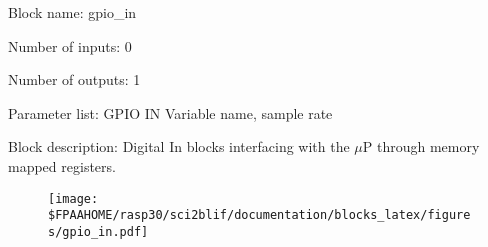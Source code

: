 \pagebreak

Block name: gpio\_in

Number of inputs: 0

Number of outputs: 1

Parameter list: GPIO IN Variable name, sample rate

Block description: 
Digital In blocks interfacing with the $\mu$P through memory mapped registers.

\begin{figure}[H]  %
\texttt{[image: \$FPAAHOME/rasp30/sci2blif/documentation/blocks\_latex/figures/gpio\_in.pdf]}
\end{figure}

